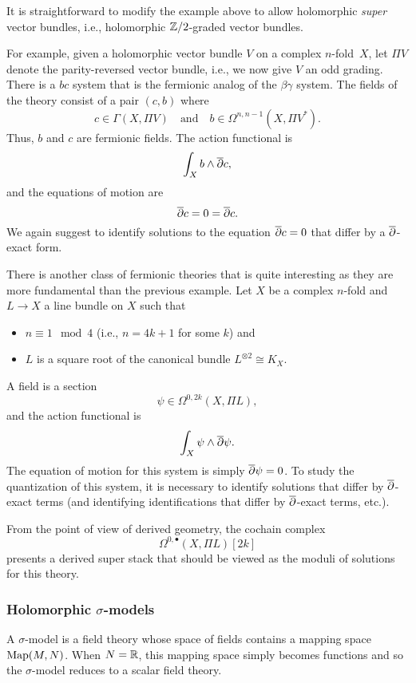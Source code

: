 \documentclass[11pt]{amsart}
\begin{document}
It is straightforward to modify the example above to allow holomorphic {\it super} vector bundles,
i.e., holomorphic $\mathbb Z/2$-graded vector bundles.

For example, given a holomorphic vector bundle $V$ on a complex $n$-fold~$X$,
let $\Pi V$ denote the parity-reversed vector bundle,
i.e., we now give $V$ an odd grading.
There is a $bc$ system that is the fermionic analog of the $\beta\gamma$ system.
The fields of the theory consist of a pair $(c,b)$ where 
\[
c \in \Gamma(X,\Pi V) \quad\text{and}\quad b \in \Omega^{n,n-1}(X,\Pi V^*) .
\]
Thus, $b$ and $c$ are fermionic fields.
The action functional is 
\[
\int_X b \wedge {\overline{\partial}} c,
\]
and the equations of motion are
\[
{\overline{\partial}} c = 0 = {\overline{\partial}} c.
\]
We again suggest to identify solutions to the equation ${\overline{\partial}} c = 0$ that differ by a ${\overline{\partial}}$-exact form.

There is another class of fermionic theories that is quite interesting as they are more fundamental than the previous example.
Let $X$ be a complex $n$-fold and $L \to X$ a line bundle on $X$ such that
\begin{itemize}
\item $n \equiv 1 \mod 4$ (i.e., $n=4k+1$ for some $k$) and
\item $L$ is a square root of the canonical bundle $L^{\otimes 2} \cong K_X$.
\end{itemize}
A field is a section
\[
\psi \in \Omega^{0,2k}(X,\Pi L),
\]
and the action functional is
\[ 
\int_X \psi \wedge {\overline{\partial}} \psi .
\]
The equation of motion for this system is simply ${\overline{\partial}} \psi = 0$.
To study the quantization of this system, it is necessary to identify solutions that differ by ${\overline{\partial}}$-exact terms (and identifying identifications that differ by ${\overline{\partial}}$-exact terms, etc.).

From the point of view of derived geometry, the cochain complex
\[
\Omega^{0,\bullet}(X, \Pi L)[2k]
\]
presents a derived super stack that should be viewed as the moduli of solutions for this theory.

\subsubsection{Holomorphic $\sigma$-models}

A $\sigma$-model is a field theory whose space of fields contains a mapping space ${\rm Map}(M,N)$.
When $N = \mathbb R$, this mapping space simply becomes functions and so the $\sigma$-model reduces to a scalar field theory.
\end{document}
